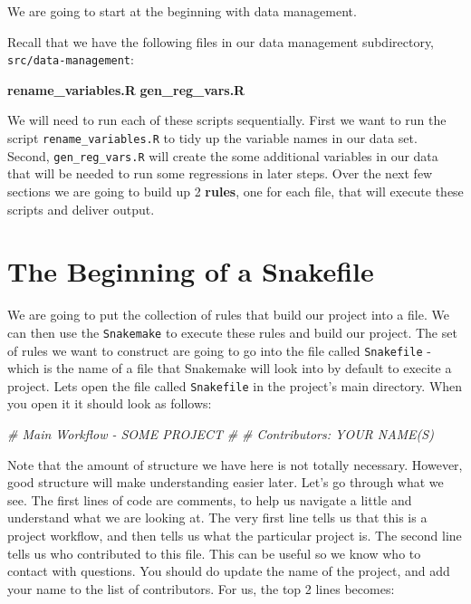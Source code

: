 \documentclass[]{book}
\newenvironment{Shaded}{\begin{snugshade}}{\end{snugshade}}
\newcommand{\KeywordTok}[1]{\textcolor[rgb]{0.13,0.29,0.53}{\textbf{{#1}}}}
\newcommand{\CommentTok}[1]{\textcolor[rgb]{0.56,0.35,0.01}{\textit{{#1}}}}
\theoremstyle{definition}
\theoremstyle{definition}
\theoremstyle{definition}
\theoremstyle{remark}
\begin{document}
We are going to start at the beginning with data management.

Recall that we have the following files in our data management
subdirectory, \texttt{src/data-management}:

\begin{Shaded}
\begin{Highlighting}[]
\KeywordTok{rename_variables.R}
\KeywordTok{gen_reg_vars.R}
\end{Highlighting}
\end{Shaded}

We will need to run each of these scripts sequentially. First we want to
run the script \texttt{rename\_variables.R} to tidy up the variable
names in our data set. Second, \texttt{gen\_reg\_vars.R} will create the
some additional variables in our data that will be needed to run some
regressions in later steps. Over the next few sections we are going to
build up 2 \textbf{rules}, one for each file, that will execute these
scripts and deliver output.

\section{The Beginning of a
Snakefile}\label{the-beginning-of-a-snakefile}

We are going to put the collection of rules that build our project into
a file. We can then use the \texttt{Snakemake} to execute these rules
and build our project. The set of rules we want to construct are going
to go into the file called \texttt{Snakefile} - which is the name of a
file that Snakemake will look into by default to execite a project. Lets
open the file called \texttt{Snakefile} in the project's main directory.
When you open it it should look as follows:

\begin{Shaded}
\begin{Highlighting}[]
\CommentTok{# Main Workflow - SOME PROJECT}
\CommentTok{#}
\CommentTok{# Contributors: YOUR NAME(S)}
\end{Highlighting}
\end{Shaded}

Note that the amount of structure we have here is not totally necessary.
However, good structure will make understanding easier later. Let's go
through what we see. The first lines of code are comments, to help us
navigate a little and understand what we are looking at. The very first
line tells us that this is a project workflow, and then tells us what
the particular project is. The second line tells us who contributed to
this file. This can be useful so we know who to contact with questions.
You should do update the name of the project, and add your name to the
list of contributors. For us, the top 2 lines becomes:
\end{document}
